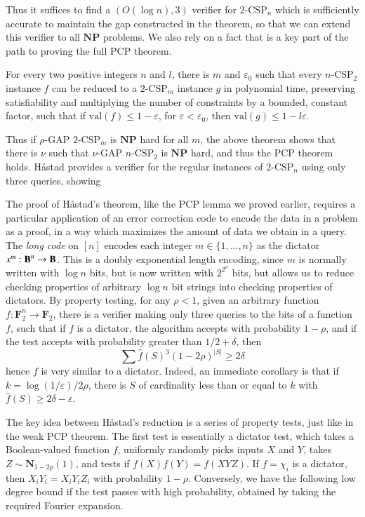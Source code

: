Thus it suffices to find a $(O(\log n), 3)$ verifier for $2\text{-CSP}_n$ which is sufficiently accurate to maintain the gap constructed in the theorem, so that we can extend this verifier to all $\mathbf{NP}$ problems. We also rely on a fact that is a key part of the path to proving the full PCP theorem.

\begin{theorem}
    For every two positive integers $n$ and $l$, there is $m$ and $\varepsilon_0$ such that every $n\text{-CSP}_2$ instance $f$ can be reduced to a $2\text{-CSP}_m$ instance $g$ in polynomial time, preserving satisfiability and multiplying the number of constraints by a bounded, constant factor, such that if $\text{val}(f) \leq 1 - \varepsilon$, for $\varepsilon < \varepsilon_0$, then $\text{val}(g) \leq 1 - l\varepsilon$.
\end{theorem}

Thus if $\rho$-GAP $2\text{-CSP}_m$ is $\mathbf{NP}$ hard for all $m$, the above theorem shows that there is $\nu$ such that $\nu$-GAP $n\text{-CSP}_2$ is $\mathbf{NP}$ hard, and thus the PCP theorem holds. Håstad provides a verifier for the regular instances of $2\text{-CSP}_n$ using only three queries, showing 

The proof of Håstad's theorem, like the PCP lemma we proved earlier, requires a particular application of an error correction code to encode the data in a problem as a proof, in a way which maximizes the amount of data we obtain in a query. The \emph{long code} on $[n]$ encodes each integer $m \in \{ 1, \dots, n \}$ as the dictator $x^m: \operatorname{\mathbf{B}}^n \to \operatorname{\mathbf{B}}$. This is a doubly exponential length encoding, since $m$ is normally written with $\log n$ bits, but is now written with $2^{2^n}$ bits, but allows us to reduce checking properties of arbitrary $\log n$ bit strings into checking properties of dictators. By property testing, for any $\rho < 1$, given an arbitrary function $f: \mathbf{F}_2^n \to \mathbf{F}_2$, there is a verifier making only three queries to the bits of a function $f$, such that if $f$ is a dictator, the algorithm accepts with probability $1 - \rho$, and if the test accepts with probability greater than $1/2 + \delta$, then
%
\[ \sum \widehat{f}(S)^3 (1 - 2 \rho)^{|S|} \geq 2 \delta \]
%
hence $f$ is very similar to a dictator. Indeed, an immediate corollary is that if $k = \log(1/\varepsilon) /2\rho$, there is $S$ of cardinality less than or equal to $k$ with $\widehat{f}(S) \geq 2\delta - \varepsilon$.

The key idea between Håstad's reduction is a series of property tests, just like in the weak PCP theorem. The first test is essentially a dictator test, which takes a Boolean-valued function $f$, uniformly randomly picks inputs $X$ and $Y$, takes $Z \sim \mathbf{N}_{1-2p}(1)$, and tests if $f(X)f(Y) = f(XYZ)$. If $f = \chi_i$ is a dictator, then $X_iY_i = X_iY_iZ_i$ with probability $1 - \rho$. Conversely, we have the following low degree bound if the test passes with high probability, obtained by taking the required Fourier expansion.

